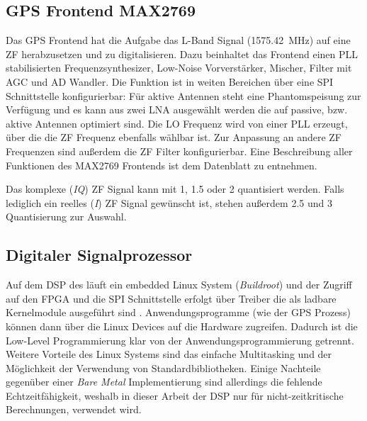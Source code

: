 \subsection{GPS Frontend MAX2769}
\label{max2769frontend}
Das GPS Frontend hat die Aufgabe das L-Band Signal (\SI{1575.42}{\MHz}) auf eine \gls{ZF} herabzusetzen und zu digitalisieren. Dazu beinhaltet das Frontend einen PLL stabilisierten Frequenzsynthesizer, Low-Noise Vorverstärker, Mischer, Filter mit \gls{AGC} und AD Wandler. Die Funktion ist in weiten Bereichen über eine SPI Schnittstelle konfigurierbar: Für aktive Antennen steht eine Phantomspeisung zur Verfügung und es kann aus zwei \gls{LNA} ausgewählt werden die auf passive, bzw. aktive Antennen optimiert sind. Die \gls{LO} Frequenz wird von einer PLL erzeugt, über die die ZF Frequenz ebenfalls wählbar ist. Zur Anpassung an andere ZF Frequenzen sind außerdem die ZF Filter konfigurierbar. Eine Beschreibung aller Funktionen des MAX2769 Frontends ist dem Datenblatt \cite{max2769} zu entnehmen.

Das komplexe (\emph{IQ}) ZF Signal kann mit \SI{1}{\bit}, \SI{1.5}{\bit} oder \SI{2}{\bit}  quantisiert werden. Falls lediglich ein reelles (\emph{I}) ZF Signal gewünscht ist, stehen außerdem  \SI{2.5}{\bit} und \SI{3}{\bit} Quantisierung zur Auswahl.


\subsection{Digitaler Signalprozessor}
Auf dem \gls{DSP} des \comboard läuft ein embedded Linux System (\emph{Buildroot}) und der Zugriff auf den FPGA und die SPI Schnittstelle erfolgt über Treiber die als ladbare Kernelmodule ausgeführt sind . Anwendungsprogramme (wie der GPS Prozess) können dann über die Linux Devices auf die Hardware zugreifen. Dadurch ist die Low-Level Programmierung klar von der Anwendungsprogrammierung getrennt. Weitere Vorteile des Linux Systems sind das einfache Multitasking und der Möglichkeit der Verwendung von Standardbibliotheken. Einige Nachteile gegenüber einer \emph{Bare Metal} Implementierung sind allerdings die fehlende Echtzeitfähigkeit, weshalb in dieser Arbeit der DSP nur für nicht-zeitkritische Berechnungen, verwendet wird.

